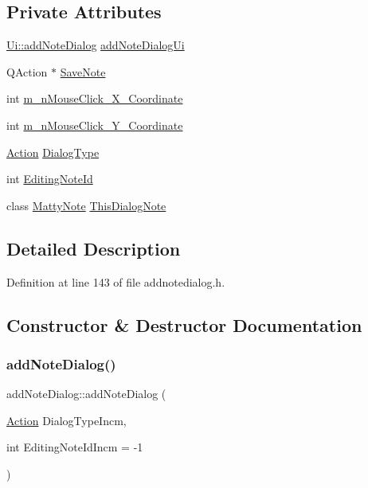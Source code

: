 \subsection*{Private Attributes}
\begin{DoxyCompactItemize}
\item 
\hyperlink{classUi_1_1addNoteDialog}{Ui\+::add\+Note\+Dialog} \hyperlink{classaddNoteDialog_a4fd2dea6a480150e92f58bc0d415a83e}{add\+Note\+Dialog\+Ui}
\item 
Q\+Action $\ast$ \hyperlink{classaddNoteDialog_a38a97c60ba07b1c2f606e7e9959829b5}{Save\+Note}
\item 
int \hyperlink{classaddNoteDialog_af54413cf6c84a6610266d9c616f44541}{m\+\_\+n\+Mouse\+Click\+\_\+\+X\+\_\+\+Coordinate}
\item 
int \hyperlink{classaddNoteDialog_aeb0351ab1bbcc76899f21224ddf4d374}{m\+\_\+n\+Mouse\+Click\+\_\+\+Y\+\_\+\+Coordinate}
\item 
\hyperlink{addnotedialog_8h_a8bb1ef53467e4f61410d12822d922498}{Action} \hyperlink{classaddNoteDialog_a6fac1eca29bdb022bad56ca2e8938846}{Dialog\+Type}
\item 
int \hyperlink{classaddNoteDialog_abd614b0fe0725fb5b2cc485acaf1e334}{Editing\+Note\+Id}
\item 
class \hyperlink{classMattyNote}{Matty\+Note} \hyperlink{classaddNoteDialog_a3bd8efdf8721f0840894f3f5856c6a2b}{This\+Dialog\+Note}
\end{DoxyCompactItemize}


\subsection{Detailed Description}


Definition at line 143 of file addnotedialog.\+h.



\subsection{Constructor \& Destructor Documentation}
\hypertarget{classaddNoteDialog_a39bdf3974bd9d583959015b40205e3f5}{}\label{classaddNoteDialog_a39bdf3974bd9d583959015b40205e3f5} 
\subsubsection{\texorpdfstring{add\+Note\+Dialog()}{addNoteDialog()}}
{\footnotesize\ttfamily add\+Note\+Dialog\+::add\+Note\+Dialog (\begin{DoxyParamCaption}\item[{\hyperlink{addnotedialog_8h_a8bb1ef53467e4f61410d12822d922498}{Action}}]{Dialog\+Type\+Incm,  }\item[{int}]{Editing\+Note\+Id\+Incm = {\ttfamily -\/1} }\end{DoxyParamCaption})}



